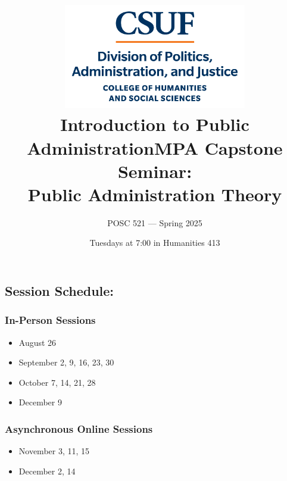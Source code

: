 \documentclass[12pt, letterpaper]{article}
\begin{document}
\title{\includegraphics[width=8cm]{Images/stacked.png} \\ \textbf{Introduction to Public Administration}}

\title{MPA Capstone Seminar: \\ Public Administration Theory}
\author{POSC 521 — Spring 2025}
\date{Tuesdays at 7:00 in Humanities 413}

\maketitle
        \subsection*{Session Schedule:}
                            
        \begin{multicols}{2}
        \subsubsection*{In-Person Sessions}
        \begin{itemize}[leftmargin=*]
            \item August 26
            \item September 2, 9, 16, 23, 30
            \item October 7, 14, 21, 28
            \item December 9
        \end{itemize}
                            
        \columnbreak
                            
        \subsubsection*{Asynchronous Online Sessions}
        \begin{itemize}[leftmargin=*]
            \item November 3, 11, 15
            \item December 2, 14
        \end{itemize}
        \end{multicols}
\end{document}
